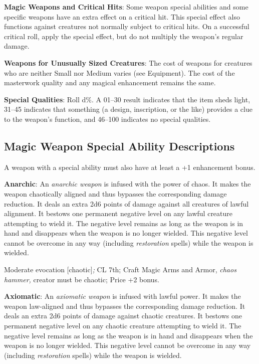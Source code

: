 \textbf{Magic Weapons and Critical Hits}: Some weapon special abilities and some specific weapons have an extra effect on a critical hit. This special effect also functions against creatures not normally subject to critical hits. On a successful critical roll, apply the special effect, but do not multiply the weapon's regular damage. 
				
\textbf{Weapons for Unusually Sized Creatures}: The cost of weapons for creatures who are neither Small nor Medium varies (see Equipment). The cost of the masterwork quality and any magical enhancement remains the same.
				
\textbf{Special Qualities}: Roll d\%. A 01--30 result indicates that the item sheds light, 31--45 indicates that something (a design, inscription, or the like) provides a clue to the weapon's function, and 46--100 indicates no special qualities. 
				
\subsection{Magic Weapon Special Ability Descriptions}

				
A weapon with a special ability must also have at least a +1 enhancement bonus.
				
\textbf{Anarchic}: An \textit{anarchic weapon} is infused with the power of chaos. It makes the weapon chaotically aligned and thus bypasses the corresponding damage reduction. It deals an extra 2d6 points of damage against all creatures of lawful alignment. It bestows one permanent negative level on any lawful creature attempting to wield it. The negative level remains as long as the weapon is in hand and disappears when the weapon is no longer wielded. This negative level cannot be overcome in any way (including \textit{restoration }spells) while the weapon is wielded.
				
Moderate evocation \mbox{$[$}chaotic\mbox{$]$}\textit{; }CL 7th; Craft Magic Arms and Armor, \textit{chaos hammer, }creator must be chaotic; Price +2 bonus.
				
\textbf{Axiomatic}: An \textit{axiomatic weapon} is infused with lawful power. It makes the weapon law-aligned and thus bypasses the corresponding damage reduction. It deals an extra 2d6 points of damage against chaotic creatures. It bestows one permanent negative level on any chaotic creature attempting to wield it. The negative level remains as long as the weapon is in hand and disappears when the weapon is no longer wielded. This negative level cannot be overcome in any way (including \textit{restoration }spells) while the weapon is wielded.
				
